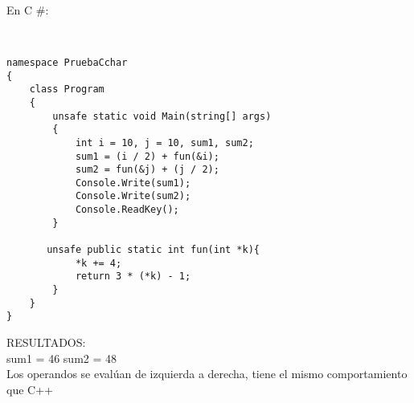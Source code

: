 En C \#:


\lstset{language = C++} 
\begin{lstlisting}[frame = single] %Comienzo del Código


namespace PruebaCchar
{
    class Program
    {
        unsafe static void Main(string[] args)
        {
            int i = 10, j = 10, sum1, sum2;
            sum1 = (i / 2) + fun(&i);
            sum2 = fun(&j) + (j / 2);
            Console.Write(sum1);
            Console.Write(sum2);
            Console.ReadKey();
        }

       unsafe public static int fun(int *k){
            *k += 4;
            return 3 * (*k) - 1;
        }
    }
}

\end{lstlisting}

RESULTADOS: \\
sum1 = 46
sum2 = 48\\
Los operandos se evalúan de izquierda a derecha, tiene el mismo comportamiento que C++
